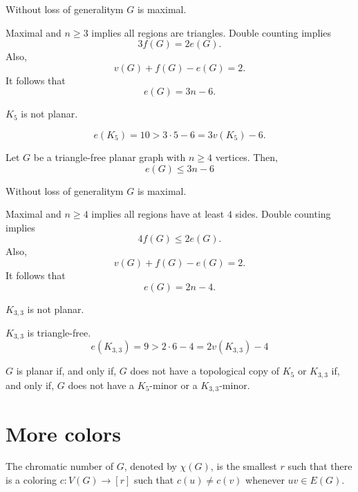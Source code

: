 \begin{dem}
	Without loss of generalitym $G$ is maximal.

	Maximal and $n \ge 3$ implies all regions are triangles. Double counting implies \[
		3f(G) = 2e(G).
	\]
	Also, \[
		v(G) + f(G) - e(G) = 2.
	\]
	It follows that	\[
		e(G) = 3n - 6.
	\]
\end{dem}

\begin{thm}
	$K_5$ is not planar.
\end{thm}
\begin{dem}
	\[
		e(K_5) = 10 > 3\cdot5 - 6 = 3v(K_5) - 6.
	\]
\end{dem}

\begin{thm}
	Let $G$ be a triangle-free planar graph with $n \ge 4$ vertices. Then, \[
		e(G) \le 3n - 6
	\]
\end{thm}

\begin{dem}
	Without loss of generalitym $G$ is maximal.

	Maximal and $n \ge 4$ implies all regions have at least $4$ sides. Double counting implies \[
		4f(G) \le 2e(G).
	\]
	Also, \[
		v(G) + f(G) - e(G) = 2.
	\]
	It follows that	\[
		e(G) = 2n - 4.
	\]
\end{dem}

\begin{thm}
	$K_{3, 3}$ is not planar.
\end{thm}
\begin{dem}
	$K_{3, 3}$ is triangle-free.
	\[
		e(K_{3, 3}) = 9 > 2\cdot6 - 4 = 2v(K_{3, 3}) - 4
	\] 
\end{dem}

\begin{thm}
	$G$ is planar if, and only if, $G$ does not have a topological copy of $K_5$ or $K_{3, 3}$ if, and only if, $G$ does not have a $K_5$-minor or a $K_{3, 3}$-minor.
\end{thm}

\newpage
\section{More colors}

\begin{defn}
	The chromatic number of $G$, denoted by $\chi(G)$, is the smallest $r$ such that there is a coloring $c \colon V(G) \to [r]$ such that $c(u) \neq c(v)$ whenever $uv \in E(G)$.
\end{defn}


